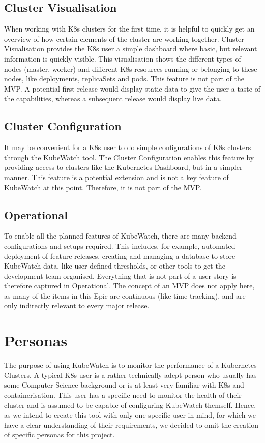 \subsection{Cluster Visualisation}
When working with K8s clusters for the first time, it is helpful to quickly get an overview of how certain elements of the cluster are working together. Cluster Visualisation provides the K8s user a simple dashboard where basic, but relevant information is quickly visible. This visualisation shows the different types of nodes (master, worker) and different K8s resources running or belonging to these nodes, like deployments, replicaSets and pods. This feature is not part of the MVP. A potential first release would display static data to give the user a taste of the capabilities, whereas a subsequent release would display live data. 

\subsection{Cluster Configuration}
It may be convenient for a K8s user to do simple configurations of K8s clusters through the KubeWatch tool. The Cluster Configuration enables this feature by providing access to clusters like the Kubernetes Dashboard, but in a simpler manner. This feature is a potential extension and is not a key feature of KubeWatch at this point. Therefore, it is not part of the MVP.

\subsection{Operational}
To enable all the planned features of KubeWatch, there are many backend configurations and setups required. This includes, for example, automated deployment of feature releases, creating and managing a database to store KubeWatch data, like user-defined thresholds, or other tools to get the development team organised. Everything that is not part of a user story is therefore captured in Operational. The concept of an MVP does not apply here, as many of the items in this Epic are continuous (like time tracking), and are only indirectly relevant to every major release.

\section{Personas}

The purpose of using KubeWatch is to monitor the performance of a Kubernetes Clusters. A typical K8s user is a rather technically adept person who usually has some Computer Science background or is at least very familiar with K8s and containerisation. This user has a specific need to monitor the health of their cluster and is assumed to be capable of configuring KubeWatch themself. Hence, as we intend to create this tool with only one specific user in mind, for which we have a clear understanding of their requirements, we decided to omit the creation of specific personas for this project.

